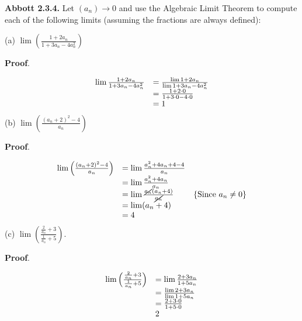 \documentclass[10pt]{article}
\begin{document}
\textbf{Abbott 2.3.4.} Let $\displaystyle ( a_{n})\rightarrow 0$ and use the Algebraic Limit Theorem to compute each of the following limits (assuming the fractions are always defined):



(a) $\displaystyle \lim \left(\frac{1+2a_{n}}{1+3a_{n} -4a_{n}^{2}}\right)$



\textbf{Proof}.


\begin{equation*}
\begin{array}{ c l }
\lim \frac{1+2a_{n}}{1+3a_{n} -4a_{n}^{2}} & =\frac{\lim 1+2a_{n}}{\lim 1+3a_{n} -4a_{n}^{2}}\\
 & =\frac{1+2\cdot 0}{1+3\cdot 0-4\cdot 0}\\
 & =1
\end{array}
\end{equation*}
(b) $\displaystyle \lim \left(\frac{( a_{n} +2)^{2} -4}{a_{n}}\right)$



\textbf{Proof}.




\begin{equation*}
\begin{array}{ c l c }
\lim \left(\frac{( a_{n} +2)^{2} -4}{a_{n}}\right) & =\lim \frac{a_{n}^{2} +4a_{n} +4-4}{a_{n}} & \\
 & =\lim \frac{a_{n}^{2} +4a_{n}}{a_{n}} & \\
 & =\lim \frac{\cancel{a_{n}}( a_{n} +4)}{\cancel{a_{n}}} & \left\{\text{Since } a_{n} \neq 0\right\}\\
 & =\lim ( a_{n} +4) & \\
 & =4 & 
\end{array}
\end{equation*}
(c) $\displaystyle \lim \left(\frac{\frac{2}{a_{n}} +3}{\frac{1}{a_{n}} +5}\right)$.



\textbf{Proof}.




\begin{equation*}
\begin{array}{ c l }
\lim \left(\frac{\frac{2}{a_{n}} +3}{\frac{1}{a_{n}} +5}\right) & =\lim \frac{2+3a_{n}}{1+5a_{n}}\\
 & =\frac{\lim 2+3a_{n}}{\lim 1+5a_{n}}\\
 & =\frac{2+3\cdot 0}{1+5\cdot 0}\\
 & 2
\end{array}
\end{equation*}
\end{document}
